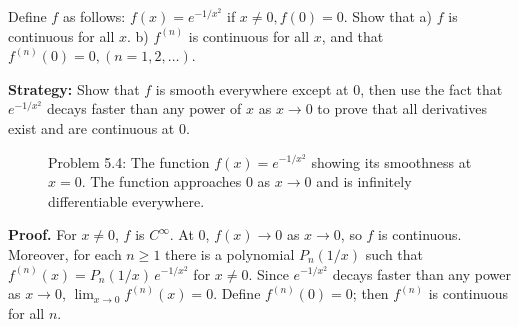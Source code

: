 \begin{problembox}
\begin{problemstatement}
Define \( f \) as follows: \( f(x) = e^{-1/x^2} \) if \( x \neq 0, f(0) = 0 \). Show that
a) \( f \) is continuous for all \( x \).
b) \( f^{(n)} \) is continuous for all \( x \), and that \( f^{(n)}(0) = 0, (n = 1, 2, \ldots ) \).
\end{problemstatement}
\end{problembox}

\noindent\textbf{Strategy:} Show that \( f \) is smooth everywhere except at 0, then use the fact that \( e^{-1/x^2} \) decays faster than any power of \( x \) as \( x \to 0 \) to prove that all derivatives exist and are continuous at 0.

\begin{figure}[h]
\centering
{}
\caption{Problem 5.4: The function $f(x) = e^{-1/x^2}$ showing its smoothness at $x=0$. The function approaches 0 as $x \to 0$ and is infinitely differentiable everywhere.}
\end{figure}

\noindent\textbf{Proof.}
For $x\ne 0$, $f$ is $C^{\infty}$. At $0$, $f(x)\to 0$ as $x\to 0$, so $f$ is continuous. Moreover, for each $n\ge 1$ there is a polynomial $P_n(1/x)$ such that $f^{(n)}(x)=P_n(1/x)\,e^{-1/x^2}$ for $x\ne 0$. Since $e^{-1/x^2}$ decays faster than any power as $x\to 0$, $\lim_{x\to 0}f^{(n)}(x)=0$. Define $f^{(n)}(0)=0$; then $f^{(n)}$ is continuous for all $n$.



